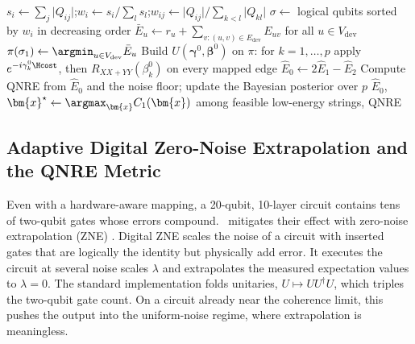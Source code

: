 \begin{algorithm}[htbp]
\caption{\deal\ with dynamic physical mapping.}\label{alg:deal}
$s_{i}\gets\sum_{j}\lvert Q_{ij}\rvert$;\quad $w_{i}\gets s_{i}/\sum_{l}s_{l}$;\quad $w_{ij}\gets \lvert Q_{ij}\rvert/\sum_{k<l}\lvert Q_{kl}\rvert$ 
$\sigma\gets$ logical qubits sorted by $w_{i}$ in decreasing order\;
$\bar{E}_{u}\gets r_{u}+\sum_{v:(u,v)\in E_{\mathrm{dev}}}E_{uv}$ for all $u\in V_{\mathrm{dev}}$ 
$\pi(\sigma_{1})\gets\argmin_{u\in V_{\mathrm{dev}}}\bar{E}_{u}$\;
Build $U(\bm{\gamma}^{0},\bm{\beta}^{0})$ on $\pi$: for $k=1,\dots,p$ apply $e^{-i\gamma_{k}^{0}\Hcost}$, then $R_{XX+YY}(\beta_{k}^{0})$ on every mapped edge\;
$\hat{E}_{0}\gets 2\hat{E}_{1}-\hat{E}_{2}$ 
Compute QNRE from $\hat{E}_{0}$ and the noise floor; update the Bayesian posterior over $p$\;
\Return $\hat{E}_{0}$, $\bm{x}^{\star}\gets\argmax_{\bm{x}}C_{1}(\bm{x})$ among feasible low-energy strings, QNRE\;
\end{algorithm}

\subsection{Adaptive Digital Zero-Noise Extrapolation and the QNRE Metric}\label{sec:nisq:zne}

Even with a hardware-aware mapping, a 20-qubit, 10-layer circuit contains tens of two-qubit gates whose errors compound. \deal\ mitigates their effect with zero-noise extrapolation (ZNE) \cite{temme2017errormitigation,kandala2019errormitigation}. Digital ZNE \cite{giurgicatiron2020digitalzne} scales the noise of a circuit with inserted gates that are logically the identity but physically add error. It executes the circuit at several noise scales $\lambda$ and extrapolates the measured expectation values to $\lambda=0$. The standard implementation folds unitaries, $U\mapsto UU^{\dagger}U$, which triples the two-qubit gate count. On a circuit already near the coherence limit, this pushes the output into the uniform-noise regime, where extrapolation is meaningless.

